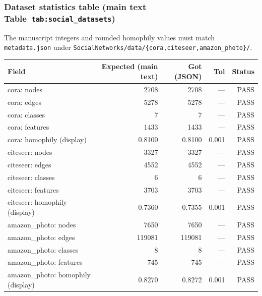 \subsubsection{Dataset statistics table (main text Table~\texttt{tab:social\_datasets})}
The manuscript integers and rounded homophily values must match \texttt{metadata.json} under \texttt{SocialNetworks/data/\{cora,citeseer,amazon\_photo\}/}.
\begin{tabular}{p{6.8cm}rrrr}
\toprule
Field & Expected (main text) & Got (JSON) & Tol & Status \\
\midrule
cora: nodes & 2708 & 2708 & --- & PASS \\
cora: edges & 5278 & 5278 & --- & PASS \\
cora: classes & 7 & 7 & --- & PASS \\
cora: features & 1433 & 1433 & --- & PASS \\
cora: homophily (display) & 0.8100 & 0.8100 & 0.001 & PASS \\
citeseer: nodes & 3327 & 3327 & --- & PASS \\
citeseer: edges & 4552 & 4552 & --- & PASS \\
citeseer: classes & 6 & 6 & --- & PASS \\
citeseer: features & 3703 & 3703 & --- & PASS \\
citeseer: homophily (display) & 0.7360 & 0.7355 & 0.001 & PASS \\
amazon_photo: nodes & 7650 & 7650 & --- & PASS \\
amazon_photo: edges & 119081 & 119081 & --- & PASS \\
amazon_photo: classes & 8 & 8 & --- & PASS \\
amazon_photo: features & 745 & 745 & --- & PASS \\
amazon_photo: homophily (display) & 0.8270 & 0.8272 & 0.001 & PASS \\
\bottomrule
\end{tabular}
